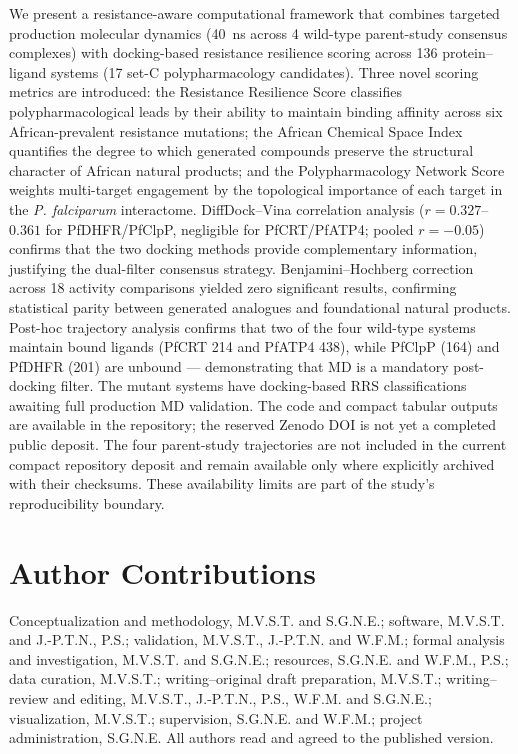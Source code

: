 \documentclass[11pt,a4paper]{article}
\begin{document}
We present a resistance-aware computational framework that combines targeted production molecular dynamics (\SI{40}{\nano\second} across 4 wild-type parent-study consensus complexes) with docking-based resistance resilience scoring across 136 protein--ligand systems (17 set-C polypharmacology candidates). Three novel scoring metrics are introduced: the Resistance Resilience Score classifies polypharmacological leads by their ability to maintain binding affinity across six African-prevalent resistance mutations; the African Chemical Space Index quantifies the degree to which generated compounds preserve the structural character of African natural products; and the Polypharmacology Network Score weights multi-target engagement by the topological importance of each target in the \textit{P. falciparum} interactome. DiffDock--Vina correlation analysis ($r = \num{0.327}$--$\num{0.361}$ for PfDHFR/PfClpP, negligible for PfCRT/PfATP4; pooled $r = \num{-0.05}$) confirms that the two docking methods provide complementary information, justifying the dual-filter consensus strategy. Benjamini--Hochberg correction across \num{18} activity comparisons yielded zero significant results, confirming statistical parity between generated analogues and foundational natural products. Post-hoc trajectory analysis confirms that two of the four wild-type systems maintain bound ligands (PfCRT 214 and PfATP4 438), while PfClpP (164) and PfDHFR (201) are unbound --- demonstrating that MD is a mandatory post-docking filter. The mutant systems have docking-based RRS classifications awaiting full production MD validation. The code and compact tabular outputs are available in the repository; the reserved Zenodo DOI is not yet a completed public deposit. The four parent-study trajectories are not included in the current compact repository deposit and remain available only where explicitly archived with their checksums. These availability limits are part of the study's reproducibility boundary.



\section*{Author Contributions}
Conceptualization and methodology, M.V.S.T. and S.G.N.E.; software, M.V.S.T. and J.-P.T.N., P.S.; validation, M.V.S.T., J.-P.T.N. and W.F.M.; formal analysis and investigation, M.V.S.T. and S.G.N.E.; resources, S.G.N.E. and W.F.M., P.S.; data curation, M.V.S.T.; writing--original draft preparation, M.V.S.T.; writing--review and editing, M.V.S.T., J.-P.T.N., P.S., W.F.M. and S.G.N.E.; visualization, M.V.S.T.; supervision, S.G.N.E. and W.F.M.; project administration, S.G.N.E. All authors read and agreed to the published version.
\end{document}
